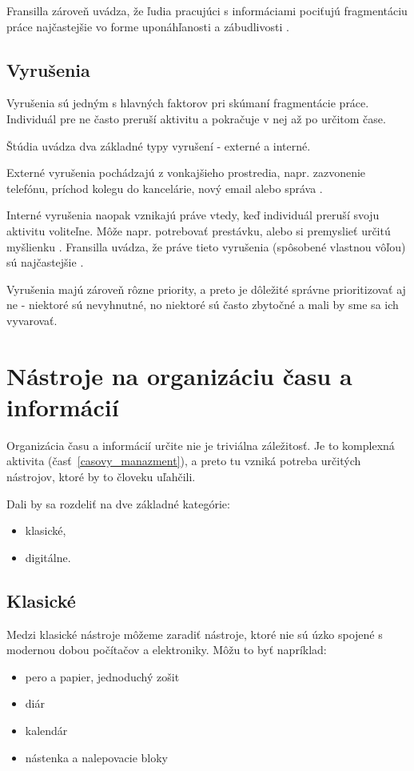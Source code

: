 \documentclass[10pt,slovak,a4paper]{article}
\begin{document}
		Fransilla zároveň uvádza, že ľudia pracujúci s informáciami pociťujú fragmentáciu práce najčastejšie vo forme uponáhľanosti a zábudlivosti \cite{Franssila}.
		
	\subsection{Vyrušenia}
		Vyrušenia sú jedným s hlavných faktorov pri skúmaní fragmentácie práce. Individuál pre ne často preruší aktivitu a pokračuje v nej až po určitom čase.
		
		Štúdia \cite{NoTask} uvádza dva základné typy vyrušení - externé a interné.
		
		Externé vyrušenia pochádzajú z vonkajšieho prostredia, napr. zazvonenie telefónu, príchod kolegu do kancelárie, nový email alebo správa \cite{NoTask}.
		
		Interné vyrušenia naopak vznikajú práve vtedy, keď individuál preruší svoju aktivitu voliteľne. Môže napr. potrebovať prestávku, alebo si premyslieť určitú myšlienku \cite{NoTask}. Fransilla uvádza, že práve tieto vyrušenia (spôsobené vlastnou vôľou) sú najčastejšie \cite{Franssila}.
		
		Vyrušenia majú zároveň rôzne priority\cite{NoTask}, a preto je dôležité správne prioritizovať aj ne - niektoré sú nevyhnutné, no niektoré sú často zbytočné a mali by sme sa ich vyvarovať.

\section{Nástroje na organizáciu času a informácií} \label{nastroje}
		Organizácia času a informácií určite nie je triviálna záležitosť. Je to komplexná aktivita (časť~\ref{casovy_manazment}), a preto tu vzniká potreba určitých nástrojov, ktoré by to človeku uľahčili.
		
		Dali by sa rozdeliť na dve základné kategórie:
		\begin{itemize}
			\item klasické,
			\item digitálne.
		\end{itemize}
		
	\subsection{Klasické}
		Medzi klasické nástroje môžeme zaradiť nástroje, ktoré nie sú úzko spojené s modernou dobou počítačov a elektroniky. Môžu to byť napríklad:
		\begin{itemize}
			\item pero a papier, jednoduchý zošit
			\item diár
			\item kalendár
			\item nástenka a nalepovacie bloky
		\end{itemize}
	
\end{document}

